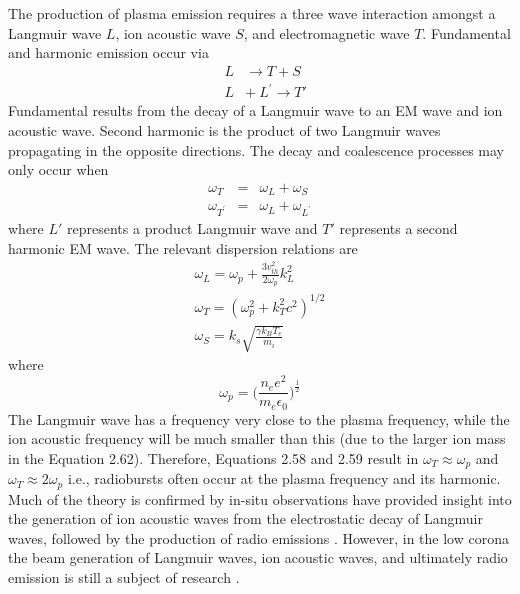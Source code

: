 
The production of plasma emission requires a three wave interaction amongst a Langmuir wave $L$, ion acoustic wave $S$, and electromagnetic wave $T$. Fundamental and harmonic emission occur via 
\begin{eqnarray}
&L& \rightarrow T + S \\
&L& + ~L^{'}\rightarrow T'
\end{eqnarray}
Fundamental results from the decay of a Langmuir wave to an EM wave and ion acoustic wave. Second harmonic is the product of two Langmuir waves propagating in the opposite directions. The decay and coalescence processes may only occur when
\begin{eqnarray}
\omega_T & = & \omega_L + \omega_S \\
\omega_{T^{'}} & = & \omega_L + \omega_{L^{'}}
\end{eqnarray}
where $L'$ represents a product Langmuir wave and $T'$ represents a second harmonic EM wave. The relevant dispersion relations are 
\begin{eqnarray}
\omega_L = \omega_p + \frac{3v_{th}^2}{2\omega_p}k_L^2 \\
\omega_T = (\omega_p^2 +k_T^2c^2)^{1/2} \\
\omega_S = k_s\sqrt{\frac{\gamma k_B T_e}{m_i}}
\end{eqnarray}
where
\begin{equation}
\omega_p = \bigg(\frac{n_e e^2}{m_e \epsilon_0}\bigg)^\frac{1}{2}
\label{eqn:plasma_frequency}
\end{equation}
The Langmuir wave has a frequency very close to the plasma frequency, while the ion acoustic frequency will be much smaller than this (due to the larger ion mass in the Equation 2.62). Therefore, Equations 2.58 and 2.59 result in $\omega_T \approx \omega_p$ and $\omega_T\approx 2\omega_p$ i.e., radiobursts often occur at the plasma frequency and its harmonic. Much of the theory is confirmed by in-situ observations have provided insight into the generation of ion acoustic waves from the electrostatic decay of Langmuir waves, followed by the production of radio emissions \citep{thejappa1998}. However, in the low corona the beam generation of Langmuir waves, ion acoustic waves, and ultimately radio emission is still a subject of research \citep{kontar2001, reid2010, ratcliffe2012}.

